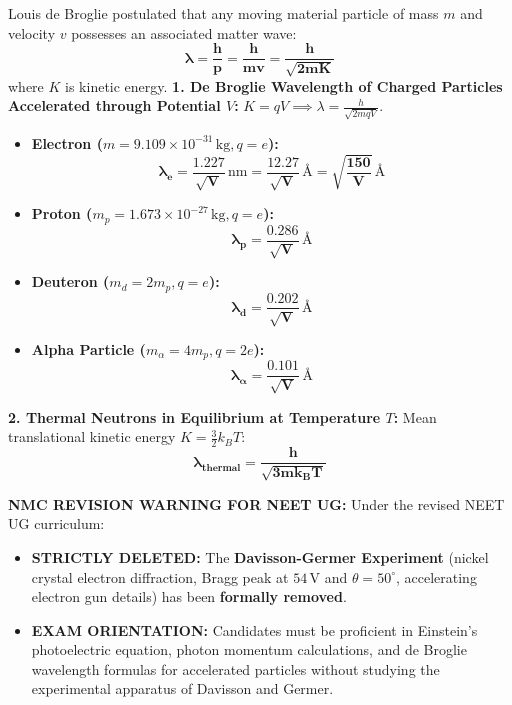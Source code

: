 \documentclass[10pt,a4paper]{article}
\begin{document}
\begin{formulabox}
Louis de Broglie postulated that any moving material particle of mass $m$ and velocity $v$ possesses an associated matter wave:
\begin{equation}
  \mathbf{\lambda = \frac{h}{p} = \frac{h}{m v} = \frac{h}{\sqrt{2 m K}}}
\end{equation}
where $K$ is kinetic energy.
\textbf{1. De Broglie Wavelength of Charged Particles Accelerated through Potential $V$:}
$K = q V \implies \lambda = \frac{h}{\sqrt{2 m q V}}$.
\begin{itemize}
  \item \textbf{Electron ($m = 9.109 \times 10^{-31}\,\mathrm{kg}, q = e$):}
  \begin{equation}
    \mathbf{\lambda_e = \frac{1.227}{\sqrt{V}}\,\mathrm{nm} = \frac{12.27}{\sqrt{V}}\,\text{\AA} = \sqrt{\frac{150}{V}}\,\text{\AA}}
  \end{equation}
  \item \textbf{Proton ($m_p = 1.673 \times 10^{-27}\,\mathrm{kg}, q = e$):}
  \begin{equation}
    \mathbf{\lambda_p = \frac{0.286}{\sqrt{V}}\,\text{\AA}}
  \end{equation}
  \item \textbf{Deuteron ($m_d = 2m_p, q = e$):}
  \begin{equation}
    \mathbf{\lambda_d = \frac{0.202}{\sqrt{V}}\,\text{\AA}}
  \end{equation}
  \item \textbf{Alpha Particle ($m_\alpha = 4m_p, q = 2e$):}
  \begin{equation}
    \mathbf{\lambda_\alpha = \frac{0.101}{\sqrt{V}}\,\text{\AA}}
  \end{equation}
\end{itemize}
\textbf{2. Thermal Neutrons in Equilibrium at Temperature $T$:}
Mean translational kinetic energy $K = \frac{3}{2}k_B T$:
\begin{equation}
  \mathbf{\lambda_{\text{thermal}} = \frac{h}{\sqrt{3 m k_B T}}}
\end{equation}
\end{formulabox}

\begin{trapbox}
\textbf{NMC REVISION WARNING FOR NEET UG:}
Under the revised NEET UG curriculum:
\begin{itemize}
  \item \textbf{STRICTLY DELETED:} The \textbf{Davisson-Germer Experiment} (nickel crystal electron diffraction, Bragg peak at $54\,\mathrm{V}$ and $\theta = 50^\circ$, accelerating electron gun details) has been \textbf{formally removed}.
  \item \textbf{EXAM ORIENTATION:} Candidates must be proficient in Einstein's photoelectric equation, photon momentum calculations, and de Broglie wavelength formulas for accelerated particles without studying the experimental apparatus of Davisson and Germer.
\end{itemize}
\end{trapbox}
\end{document}
